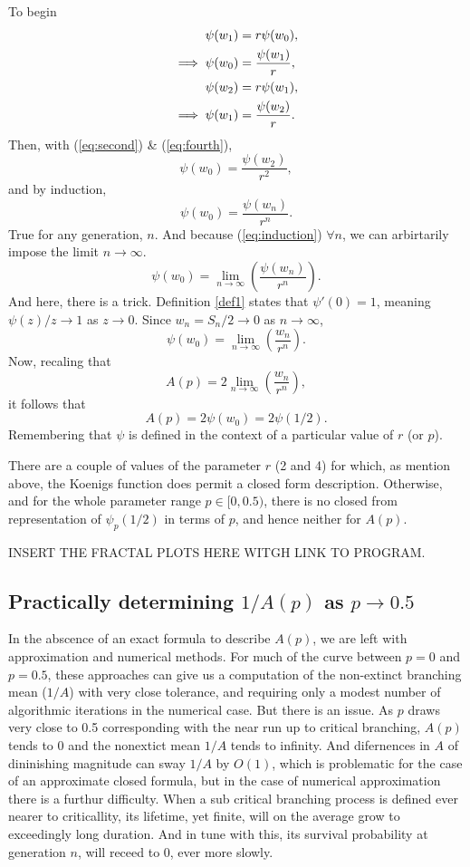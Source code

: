 \documentclass[11pt]{article}
\begin{document}
\vspace{10pt}
\noindent
To begin 
\begin{align}
\psi(w_1) &= r\psi(w_0), \notag\\
\implies \psi(w_0) &= \frac{\psi(w_1)}{r}, \label{eq:second} \\
\psi(w_2) &= r\psi(w_1), \notag\\
\implies \psi(w_1) &= \frac{\psi(w_2)}{r}. \label{eq:fourth}
\end{align}
Then, with (\ref{eq:second}) \& (\ref{eq:fourth}),
$$\psi(w_0) = \frac{\psi(w_2)}{r^2},$$
and by induction,
\begin{equation}
\psi(w_0) = \frac{\psi(w_n)}{r^n}.
\label{eq:induction}
\end{equation}
True for any generation, $n$. And because (\ref{eq:induction}) $\forall n$, we can arbirtarily impose the limit $n\to\infty$.
$$\psi(w_0) = \lim_{n\to\infty}\left(\frac{\psi(w_n)}{r^n}\right).$$
And here, there is a trick. Definition \ref{def1} states that $\psi'(0) = 1$, meaning $\psi(z)/z\to 1$ as $z\to0$. Since $w_n = S_n/2 \to 0$ as $n\to\infty$,
$$\psi(w_0) = \lim_{n\to\infty}\left(\frac{w_n}{r^n}\right).$$
Now, recaling that $$A(p) = 2\lim_{n\to\infty}\left(\frac{w_n}{r^n}\right),$$
it follows that
$$A(p) = 2\psi(w_0) = 2\psi(1/2).$$         
Remembering that $\psi$ is defined in the context of a particular value of $r$ (or $p$).


There are a couple of values of the parameter $r$ (2 and 4) for which, as mention above, the Koenigs function does permit a closed form description. Otherwise, and for the whole parameter range $p\in[0,0.5)$, there is no closed from representation of $\psi_p(1/2)$ in terms of $p$, and hence neither for $A(p)$.


INSERT THE FRACTAL PLOTS HERE WITGH LINK TO PROGRAM.




\subsection{Practically determining $1/A(p)$ as $p\to0.5$}


In the abscence of an exact formula to describe $A(p)$, we are left with approximation and numerical methods.
For much of the curve between $p=0$ and $p=0.5$, these approaches can give us a computation of the non-extinct branching mean ($1/A$)
with very close tolerance, and requiring only a modest number of algorithmic iterations in the numerical case. But there is an issue. 
As $p$ draws very close to 0.5 corresponding with the near run up to critical branching, $A(p)$ tends to 0 and the nonextict mean $1/A$ tends to infinity.
And difernences in $A$ of dininishing magnitude can sway $1/A$ by $O(1)$, which is problematic for the case of an approximate closed formula, but in the case of numerical approximation 
there is a furthur difficulty. When a sub critical branching process is defined ever nearer to criticallity, its lifetime, yet finite, will on the average grow to exceedingly long duration. 
And in tune with this, its survival probability at generation $n$, will receed to 0, ever more slowly.
\end{document}
